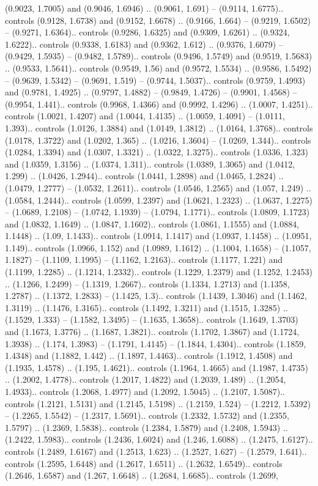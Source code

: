 (0.9023, 1.7005) and (0.9046, 1.6946) .. (0.9061, 1.691) -- (0.9114, 1.6775).. controls (0.9128, 1.6738) and (0.9152, 1.6678) .. (0.9166, 1.664) -- (0.9219, 1.6502) -- (0.9271, 1.6364).. controls (0.9286, 1.6325) and (0.9309, 1.6261) .. (0.9324, 1.6222).. controls (0.9338, 1.6183) and (0.9362, 1.612) .. (0.9376, 1.6079) -- (0.9429, 1.5935) -- (0.9482, 1.5789).. controls (0.9496, 1.5749) and (0.9519, 1.5683) .. (0.9533, 1.5641).. controls (0.9549, 1.56) and (0.9572, 1.5534) .. (0.9586, 1.5492) -- (0.9639, 1.5342) -- (0.9691, 1.519) -- (0.9744, 1.5037).. controls (0.9759, 1.4993) and (0.9781, 1.4925) .. (0.9797, 1.4882) -- (0.9849, 1.4726) -- (0.9901, 1.4568) -- (0.9954, 1.441).. controls (0.9968, 1.4366) and (0.9992, 1.4296) .. (1.0007, 1.4251).. controls (1.0021, 1.4207) and (1.0044, 1.4135) .. (1.0059, 1.4091) -- (1.0111, 1.393).. controls (1.0126, 1.3884) and (1.0149, 1.3812) .. (1.0164, 1.3768).. controls (1.0178, 1.3722) and (1.0202, 1.365) .. (1.0216, 1.3604) -- (1.0269, 1.344).. controls (1.0284, 1.3394) and (1.0307, 1.3321) .. (1.0322, 1.3275).. controls (1.0336, 1.323) and (1.0359, 1.3156) .. (1.0374, 1.311).. controls (1.0389, 1.3065) and (1.0412, 1.299) .. (1.0426, 1.2944).. controls (1.0441, 1.2898) and (1.0465, 1.2824) .. (1.0479, 1.2777) -- (1.0532, 1.2611).. controls (1.0546, 1.2565) and (1.057, 1.249) .. (1.0584, 1.2444).. controls (1.0599, 1.2397) and (1.0621, 1.2323) .. (1.0637, 1.2275) -- (1.0689, 1.2108) -- (1.0742, 1.1939) -- (1.0794, 1.1771).. controls (1.0809, 1.1723) and (1.0832, 1.1649) .. (1.0847, 1.1602).. controls (1.0861, 1.1555) and (1.0884, 1.1448) .. (1.09, 1.1433).. controls (1.0914, 1.1417) and (1.0937, 1.1458) .. (1.0951, 1.149).. controls (1.0966, 1.152) and (1.0989, 1.1612) .. (1.1004, 1.1658) -- (1.1057, 1.1827) -- (1.1109, 1.1995) -- (1.1162, 1.2163).. controls (1.1177, 1.221) and (1.1199, 1.2285) .. (1.1214, 1.2332).. controls (1.1229, 1.2379) and (1.1252, 1.2453) .. (1.1266, 1.2499) -- (1.1319, 1.2667).. controls (1.1334, 1.2713) and (1.1358, 1.2787) .. (1.1372, 1.2833) -- (1.1425, 1.3).. controls (1.1439, 1.3046) and (1.1462, 1.3119) .. (1.1476, 1.3165).. controls (1.1492, 1.3211) and (1.1515, 1.3285) .. (1.1529, 1.333) -- (1.1582, 1.3495) -- (1.1635, 1.3658).. controls (1.1649, 1.3703) and (1.1673, 1.3776) .. (1.1687, 1.3821).. controls (1.1702, 1.3867) and (1.1724, 1.3938) .. (1.174, 1.3983) -- (1.1791, 1.4145) -- (1.1844, 1.4304).. controls (1.1859, 1.4348) and (1.1882, 1.442) .. (1.1897, 1.4463).. controls (1.1912, 1.4508) and (1.1935, 1.4578) .. (1.195, 1.4621).. controls (1.1964, 1.4665) and (1.1987, 1.4735) .. (1.2002, 1.4778).. controls (1.2017, 1.4822) and (1.2039, 1.489) .. (1.2054, 1.4933).. controls (1.2068, 1.4977) and (1.2092, 1.5045) .. (1.2107, 1.5087).. controls (1.2121, 1.5131) and (1.2145, 1.5198) .. (1.2159, 1.524) -- (1.2212, 1.5392) -- (1.2265, 1.5542) -- (1.2317, 1.5691).. controls (1.2332, 1.5732) and (1.2355, 1.5797) .. (1.2369, 1.5838).. controls (1.2384, 1.5879) and (1.2408, 1.5943) .. (1.2422, 1.5983).. controls (1.2436, 1.6024) and (1.246, 1.6088) .. (1.2475, 1.6127).. controls (1.2489, 1.6167) and (1.2513, 1.623) .. (1.2527, 1.627) -- (1.2579, 1.641).. controls (1.2595, 1.6448) and (1.2617, 1.6511) .. (1.2632, 1.6549).. controls (1.2646, 1.6587) and (1.267, 1.6648) .. (1.2684, 1.6685).. controls (1.2699, 